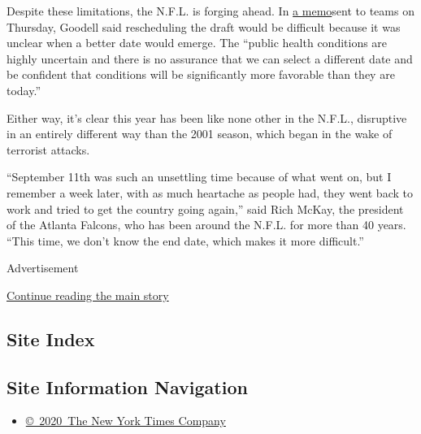 Despite these limitations, the N.F.L. is forging ahead. In
\href{https://twitter.com/AdamSchefter/status/1243320919621279744}{a
memo}sent to teams on Thursday, Goodell said rescheduling the draft
would be difficult because it was unclear when a better date would
emerge. The ``public health conditions are highly uncertain and there is
no assurance that we can select a different date and be confident that
conditions will be significantly more favorable than they are today.''

Either way, it's clear this year has been like none other in the N.F.L.,
disruptive in an entirely different way than the 2001 season, which
began in the wake of terrorist attacks.

``September 11th was such an unsettling time because of what went on,
but I remember a week later, with as much heartache as people had, they
went back to work and tried to get the country going again,'' said Rich
McKay, the president of the Atlanta Falcons, who has been around the
N.F.L. for more than 40 years. ``This time, we don't know the end date,
which makes it more difficult.''

Advertisement

\protect\hyperlink{after-bottom}{Continue reading the main story}

\hypertarget{site-index}{%
\subsection{Site Index}\label{site-index}}

\hypertarget{site-information-navigation}{%
\subsection{Site Information
Navigation}\label{site-information-navigation}}

\begin{itemize}
\tightlist
\item
  \href{https://help.nytimes3xbfgragh.onion/hc/en-us/articles/115014792127-Copyright-notice}{©~2020~The
  New York Times Company}
\end{itemize}

